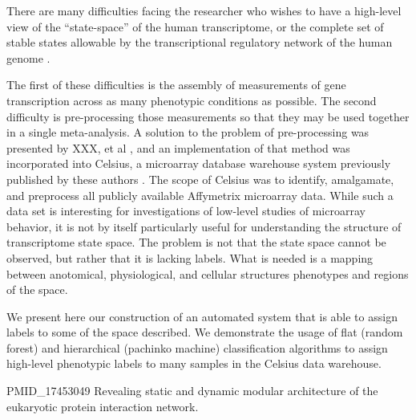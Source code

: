 There are many difficulties facing the researcher who wishes to have a
high-level view of the ``state-space'' of the human transcriptome, or the
complete set of stable states allowable by the transcriptional regulatory
network of the human genome \cite{XXX}.

The first of these difficulties is the assembly of measurements of gene
transcription across as many phenotypic conditions as possible.  The second
difficulty is pre-processing those measurements so that they may be used
together in a single meta-analysis.  A solution to the problem of
pre-processing was presented by XXX, et al \cite{genelogic}, and an
implementation of that method was incorporated into Celsius, a microarray
database warehouse system previously published by these authors \cite{celsius}.
The scope of Celsius was to identify, amalgamate, and preprocess all publicly
available Affymetrix microarray data.  While such a data set is interesting for
investigations of low-level studies of microarray behavior, it is not by itself
particularly useful for understanding the structure of transcriptome state
space.  The problem is not that the state space cannot be observed, but rather
that it is lacking labels.  What is needed is a mapping between anotomical,
physiological, and cellular structures phenotypes and regions of the space.

We present here our construction of an automated system that is able to assign
labels to some of the space described.  We demonstrate the usage of flat
(random forest) and hierarchical (pachinko machine) classification algorithms
to assign high-level phenotypic labels to many samples in the Celsius data
warehouse.


PMID_17453049	Revealing static and dynamic modular architecture of the eukaryotic protein interaction network.

